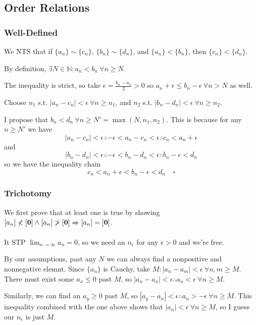 \documentclass[12pt]{article}
\newcommand{\ra}{\xRightarrow}
\newcommand{\N}{\mathbb{N}}
\begin{document}
\pagebreak

\subsection{Order Relations}

\subsubsection{Well-Defined}

We NTS that if $\{a_n\} \sim \{c_n\}$, $\{b_n\} \sim \{d_n\}$,
and $\{a_n\} < \{b_n\}$, then $\{c_n\} < \{d_n\}$.

By definition, $\exists N \in \N: a_n < b_n\ \forall n \ge N$.

The inequality is strict, so take $\epsilon=\frac{b_n-a_n}{2}>0$ so $a_n + \epsilon \le b_n - \epsilon\ \forall n > N$ as well.

Choose $n_1$ s.t. $|a_n-c_n| < \epsilon\ \forall n \ge n_1$,
and $n_2$ s.t. $|b_n-d_n| < \epsilon\ \forall n \ge n_2$.

I propose that $b_n < d_n\ \forall n \ge N' = \max(N, n_1, n_2)$.
This is because for any $n \ge N'$ we have
\[|a_n-c_n| < \epsilon \therefore -\epsilon < a_n-c_n < \epsilon \therefore c_n < a_n +\epsilon\]
and
\[|b_n-d_n| < \epsilon \therefore -\epsilon < b_n-d_n < \epsilon \therefore b_n - \epsilon < d_n\]
so we have the inequality chain
\[c_n < a_n + \epsilon < b_n - \epsilon < d_n\quad\square\]

\subsubsection{Trichotomy}

We first prove that at least one is true by showing
$[a_n] \nless [\mathbf{0}] \land [a_n] \ngtr [\mathbf{0}] \ra{} [a_n] = [\mathbf{0}]$.

It STP $\lim_{n \to \infty} a_n = 0$, so we need an $n_\epsilon$ for any $\epsilon > 0$ and we're free.

By our assumptions, past any $N$ we can always find a nonpositive and nonnegative elemnt.
Since $\{a_n\}$ is Cauchy, take $M: |a_n-a_m| < \epsilon\ \forall n, m \ge M$.
There must exist some $a_x \le 0$ past $M$, so $|a_n-a_x| < \epsilon \therefore a_n < \epsilon\ \forall n \ge M$. 

Similarly, we can find an $a_y \ge 0$ past $M$, so $|a_y-a_n| < \epsilon \therefore a_n > -\epsilon\ \forall n \ge M$.
This inequality combined with the one above shows that $|a_n| < \epsilon\ \forall n \ge M$,
so I guess our $n_\epsilon$ is just $M$.
\end{document}

